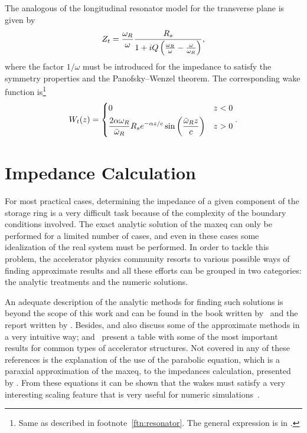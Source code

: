     The analogous of the longitudinal resonator model for the transverse plane is given by
    \begin{align}\label{eq:trans_resonator_impedance}
        Z_t =  \frac{\omega_R}{\omega}\frac{R_s}{1 + iQ\left(\frac{\omega_R}{\omega}-\frac{\omega}{\omega_R}\right)},
    \end{align}
    where the factor $1/\omega$ must be introduced for the impedance to satisfy the symmetry properties and the Panofsky--Wenzel theorem. The corresponding wake function is\footnote{Same as described in footnote~\ref{ftn:resonator}. The general expression is in .}
    \begin{align}
        W_t(z) =
        \begin{dcases}
            0 & z < 0 \\
            \frac{2\alpha\omega_R}{\bar{\omega}_R}R_se^{-\alpha z/c}
                                        \sin\left(\frac{\bar{\omega}_Rz}{c}\right) & z>0
        \end{dcases}.
    \end{align}

\section{Impedance Calculation}

    For most practical cases, determining the impedance of a given component of the storage ring is a very difficult task because of the complexity of the boundary conditions involved. The exact analytic solution of the \gls{maxeq} can only be performed for a limited number of cases, and even in these cases some idealization of the real system must be performed. In order to tackle this problem, the accelerator physics community resorts to various possible ways of finding approximate results and all these efforts can be grouped in two categories: the analytic treatments and the numeric solutions.

	An adequate description of the analytic methods for finding such solutions is beyond the scope of this work and can be found in the book written by~ and the report written by . Besides,  and  also discuss some of the approximate methods in a very intuitive way; and~ present a table with some of the most important results for common types of accelerator structures. Not covered in any of these references is the explanation of the use of the parabolic equation, which is a paraxial approximation of the \gls{maxeq}, to the impedances calculation, presented by . From these equations it can be shown that the wakes must satisfy a very interesting scaling feature that is very useful for numeric simulations~\cite{stupakov2011}.

